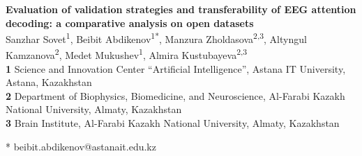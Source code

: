 \documentclass[10pt,letterpaper]{article}
\begin{document}
\vspace*{0.2in}

\begin{flushleft}
{\Large
\textbf{Evaluation of validation strategies and transferability of EEG attention decoding: a comparative analysis on open datasets} %
}
\newline
\\
Sanzhar Sovet\textsuperscript{1},
Beibit Abdikenov\textsuperscript{1*},
Manzura Zholdasova\textsuperscript{2,3},
Altyngul Kamzanova\textsuperscript{2},
Medet Mukushev\textsuperscript{1},
Almira Kustubayeva\textsuperscript{2,3}
\\
\bigskip
\textbf{1} Science and Innovation Center ``Artificial Intelligence'', Astana IT University, Astana, Kazakhstan
\\
\textbf{2} Department of Biophysics, Biomedicine, and Neuroscience, Al-Farabi Kazakh National University, Almaty, Kazakhstan
\\
\textbf{3} Brain Institute, Al-Farabi Kazakh National University, Almaty, Kazakhstan
\\
\bigskip

* beibit.abdikenov@astanait.edu.kz

\end{flushleft}
\end{document}
